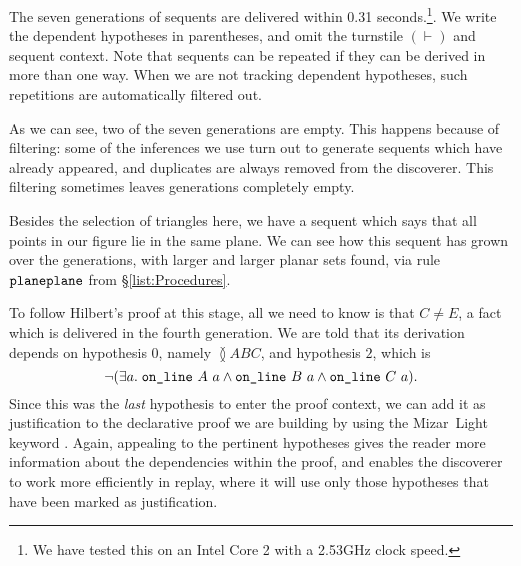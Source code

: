The seven generations of sequents are delivered within 0.31 seconds.\footnote{We have tested this on an Intel Core 2 with a 2.53GHz clock speed.}. We write the dependent hypotheses in parentheses, and omit the turnstile $(\vdash)$ and sequent context. Note that sequents can be repeated if they can be derived in more than one way. When we are not tracking dependent hypotheses, such repetitions are automatically filtered out.

As we can see, two of the seven generations are empty. This happens because of filtering: some of the inferences we use turn out to generate sequents which have already appeared, and duplicates are always removed from the discoverer. This filtering sometimes leaves generations completely empty. 

Besides the selection of triangles here, we have a sequent which says that all points in our figure lie in the same plane. We can see how this sequent has grown over the generations, with larger and larger planar sets found, via rule~$\texttt{planeplane}$ from \S\ref{list:Procedures}. 

To follow Hilbert's proof at this stage, all we need to know is that $C\neq E$, a fact which is delivered in the fourth generation. We are told that its derivation depends on hypothesis $0$, namely $\between{A}{B}{C}$, and hypothesis $2$, which is 
\begin{displaymath}
\neg(\exists a.\; \texttt{on\_line}\ A\ a\wedge \texttt{on\_line}\ B\ a\wedge \texttt{on\_line}\ C\ a).
\end{displaymath}
Since this was the \emph{last} hypothesis to enter the proof context, we can add it as justification to the declarative proof we are building by using the Mizar~Light keyword . Again, appealing to the pertinent hypotheses gives the reader more information about the dependencies within the proof, and enables the discoverer to work more efficiently in replay, where it will use only those hypotheses that have been marked as justification.

\linebreak

